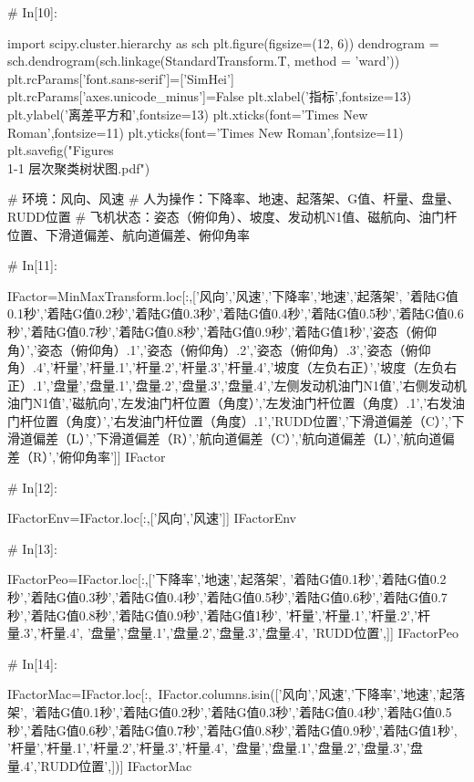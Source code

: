 \documentclass{MathorCupModeling}
\begin{document}
\begin{python}
# In[10]:


import scipy.cluster.hierarchy as sch
plt.figure(figsize=(12, 6))
dendrogram = sch.dendrogram(sch.linkage(StandardTransform.T, method = 'ward'))
plt.rcParams['font.sans-serif']=['SimHei']
plt.rcParams['axes.unicode_minus']=False
plt.xlabel('指标',fontsize=13)
plt.ylabel('离差平方和',fontsize=13)
plt.xticks(font='Times New Roman',fontsize=11)
plt.yticks(font='Times New Roman',fontsize=11)
plt.savefig("Figures\\1-1 层次聚类树状图.pdf")


# 环境：风向、风速
# 人为操作：下降率、地速、起落架、G值、杆量、盘量、RUDD位置
# 飞机状态：姿态（俯仰角）、坡度、发动机N1值、磁航向、油门杆位置、下滑道偏差、航向道偏差、俯仰角率

# In[11]:


IFactor=MinMaxTransform.loc[:,['风向','风速','下降率','地速','起落架',
                               '着陆G值0.1秒','着陆G值0.2秒','着陆G值0.3秒','着陆G值0.4秒','着陆G值0.5秒','着陆G值0.6秒','着陆G值0.7秒','着陆G值0.8秒','着陆G值0.9秒','着陆G值1秒','姿态（俯仰角）','姿态（俯仰角）.1','姿态（俯仰角）.2','姿态（俯仰角）.3','姿态（俯仰角）.4','杆量','杆量.1','杆量.2','杆量.3','杆量.4','坡度（左负右正）','坡度（左负右正）.1','盘量','盘量.1','盘量.2','盘量.3','盘量.4','左侧发动机油门N1值','右侧发动机油门N1值','磁航向','左发油门杆位置（角度）','左发油门杆位置（角度）.1','右发油门杆位置（角度）','右发油门杆位置（角度）.1','RUDD位置','下滑道偏差（C）','下滑道偏差（L）','下滑道偏差（R）','航向道偏差（C）','航向道偏差（L）','航向道偏差（R）','俯仰角率']]
IFactor


# In[12]:


IFactorEnv=IFactor.loc[:,['风向','风速']]
IFactorEnv


# In[13]:


IFactorPeo=IFactor.loc[:,['下降率','地速','起落架',
                          '着陆G值0.1秒','着陆G值0.2秒','着陆G值0.3秒','着陆G值0.4秒','着陆G值0.5秒','着陆G值0.6秒','着陆G值0.7秒','着陆G值0.8秒','着陆G值0.9秒','着陆G值1秒',
                          '杆量','杆量.1','杆量.2','杆量.3','杆量.4',
                          '盘量','盘量.1','盘量.2','盘量.3','盘量.4',
                          'RUDD位置',]]
IFactorPeo


# In[14]:


IFactorMac=IFactor.loc[:,~IFactor.columns.isin(['风向','风速','下降率','地速','起落架',
                          '着陆G值0.1秒','着陆G值0.2秒','着陆G值0.3秒','着陆G值0.4秒','着陆G值0.5秒','着陆G值0.6秒','着陆G值0.7秒','着陆G值0.8秒','着陆G值0.9秒','着陆G值1秒',
                          '杆量','杆量.1','杆量.2','杆量.3','杆量.4',
                          '盘量','盘量.1','盘量.2','盘量.3','盘量.4','RUDD位置',])]
IFactorMac



\end{python}
\end{document}
